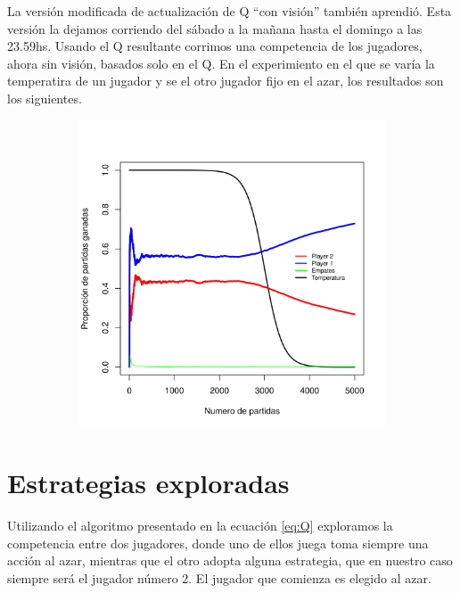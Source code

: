 \documentclass[11pt, spanish]{article}
\begin{document}
La versi\'on modificada de actualizaci\'on de Q ``con visi\'on'' tambi\'en aprendi\'o. Esta versi\'on la dejamos corriendo del s\'abado a la ma\~nana hasta el domingo a las 23.59hs. Usando el Q resultante corrimos una competencia de los jugadores, ahora sin visi\'on, basados solo en el Q. En el experimiento en el que se var\'ia la temperatira de un jugador y se el otro jugador fijo en el azar, los resultados son los siguientes. 

\begin{figure}[H]
    \centering
    \begin{subfigure}[b]{0.45\textwidth}
      \includegraphics[width=\textwidth]{Imagenes/SinVision_disipacion_QconVison}
    \end{subfigure}
\end{figure}


\section{Estrategias exploradas}
\par Utilizando el algoritmo presentado en la ecuación \ref{eq:Q} exploramos la competencia entre dos jugadores, donde uno de ellos juega toma siempre una acción al azar, mientras que el otro adopta alguna estrategia, que en nuestro caso siempre será el jugador número 2. El jugador que comienza es elegido al azar.
\end{document}
